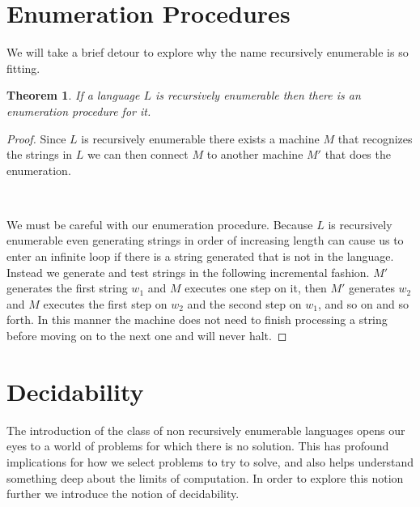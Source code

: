 \documentclass[11pt]{exam}
\newtheorem{theorem}{Theorem}[section]
\begin{document}
\newpage 

\section{Enumeration Procedures}

We will take a brief detour to explore why the name recursively enumerable is so fitting. 

\begin{theorem}
If a language $L$ is recursively enumerable then there is an enumeration procedure for it.
\end{theorem}

\begin{proof}
Since $L$ is recursively enumerable there exists a machine $M$ that recognizes the strings in $L$ we can then connect $M$ to another machine $M'$ that does the enumeration.
\begin{center}
\\
\end{center}

We must be careful with our enumeration procedure. Because $L$ is recursively enumerable even generating strings in order of increasing length can cause us to enter an infinite loop if there is a string generated that is not in the language. Instead we generate and test strings in the following incremental fashion.
$M'$ generates the first string $w_1$ and $M$ executes one step on it, then $M'$ generates $w_2$ and $M$ executes the first step on $w_2$ and the second step on $w_1$, and so on and so forth. In this manner the machine does not need to finish processing a string before moving on to the next one and will never halt. 
\end{proof}

\newpage

\section{Decidability}

The introduction of the class of non recursively enumerable languages opens our eyes to a world of problems for which there is no solution. This has profound implications for how we select problems to try to solve, and also helps understand something deep about the limits of computation. In order to explore this notion further we introduce the notion of decidability.\\
\end{document}
